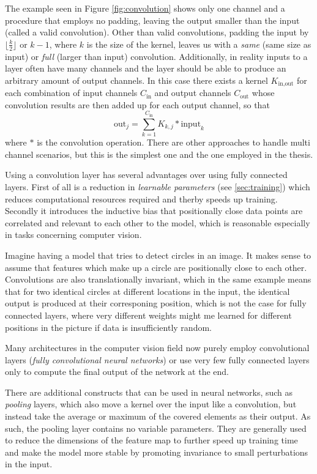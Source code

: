 The example seen in Figure \ref*{fig:convolution} shows only one channel and a procedure that employs no padding, leaving the output smaller than the input (called a valid convolution). Other than valid convolutions, padding the input by $\lfloor\frac{k}{2}\rfloor$ or $k - 1$, where $k$ is the size of the kernel, leaves us with a \emph{same} (same size as input) or \emph{full} (larger than input) convolution. Additionally, in reality inputs to a layer often have many channels and the layer should be able to produce an arbitrary amount of output channels. In this case there exists a kernel $K_{\text{in}, \text{out}}$ for each combination of input channels $C_\text{in}$ and output channels $C_{\text{out}}$ whose convolution results are then added up for each output channel, so that
$$
    \text{out}_j = \sum_{k=1}^{C_\text{in}} K_{k,j} * \text{input}_k
$$
where $*$ is the convolution operation. There are other approaches to handle multi channel scenarios, but this is the simplest one and the one employed in the thesis. 

Using a convolution layer has several advantages over using fully connected layers. First of all is a reduction in \emph{learnable parameters} (see \ref*{sec:training}) which reduces computational resources required and therby speeds up training. Secondly it introduces the inductive bias that positionally close data points are correlated and relevant to each other to the model, which is reasonable especially in tasks concerning computer vision. 

Imagine having a model that tries to detect circles in an image. It makes sense to assume that features which make up a circle are positionally close to each other. Convolutions are also translationally invariant, which in the same example means that for two identical circles at different locations in the input, the identical output is produced at their corresponing position, which is not the case for fully connected layers, where very different weights might me learned for different positions in the picture if data is insufficiently random.

Many architectures in the computer vision field now purely employ convolutional layers (\emph{fully convolutional neural networks}) or use very few fully connected layers only to compute the final output of the network at the end. 

There are additional constructs that can be used in neural networks, such as \emph{pooling} layers, which also move a kernel over the input like a convolution, but instead take the average or maximum of the covered elements as their output. As such, the pooling layer contains no variable parameters. They are generally used to reduce the dimensions of the feature map to further speed up training time and make the model more stable by promoting invariance to small perturbations in the input.